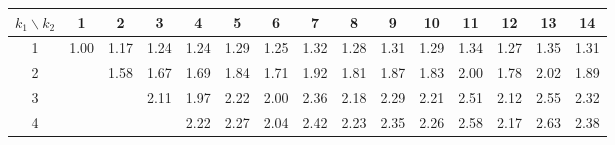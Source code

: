 \documentclass[a4paper, 11pt, ngerman]{article}
\theoremstyle{definition}
\theoremstyle{plain}
\theoremstyle{remark}
\begin{document}
\begin{figure}
    \vspace{0.2em}

    \begin{tabular}{c|cccccccccccccc}
        $k_1 \backslash k_2$ & 1                                & 2                                & 3                                & 4                                & 5                                & 6                                & 7                                & 8                                & 9                                & 10                               & 11                               & 12                               & 13                               & 14                               \\
        \hline
        1                    & \textcolor[HTML]{ 0020ff }{1.00} & \textcolor[HTML]{ 0c20f2 }{1.17} & \textcolor[HTML]{ 1120ed }{1.24} & \textcolor[HTML]{ 1220ec }{1.24} & \textcolor[HTML]{ 1520e9 }{1.29} & \textcolor[HTML]{ 1220ec }{1.25} & \textcolor[HTML]{ 1720e7 }{1.32} & \textcolor[HTML]{ 1520e9 }{1.28} & \textcolor[HTML]{ 1620e8 }{1.31} & \textcolor[HTML]{ 1520e9 }{1.29} & \textcolor[HTML]{ 1920e5 }{1.34} & \textcolor[HTML]{ 1420ea }{1.27} & \textcolor[HTML]{ 1a20e4 }{1.35} & \textcolor[HTML]{ 1720e7 }{1.31} \\
        2                    &                                  & \textcolor[HTML]{ 2b20d3 }{1.58} & \textcolor[HTML]{ 3220cc }{1.67} & \textcolor[HTML]{ 3320cb }{1.69} & \textcolor[HTML]{ 3e20c0 }{1.84} & \textcolor[HTML]{ 3520c9 }{1.71} & \textcolor[HTML]{ 4420ba }{1.92} & \textcolor[HTML]{ 3c20c2 }{1.81} & \textcolor[HTML]{ 4120bd }{1.87} & \textcolor[HTML]{ 3d20c1 }{1.83} & \textcolor[HTML]{ 4a20b4 }{2.00} & \textcolor[HTML]{ 3a20c4 }{1.78} & \textcolor[HTML]{ 4c20b2 }{2.02} & \textcolor[HTML]{ 4220bc }{1.89} \\
        3                    &                                  &                                  & \textcolor[HTML]{ 5220ac }{2.11} & \textcolor[HTML]{ 4820b6 }{1.97} & \textcolor[HTML]{ 5b20a3 }{2.22} & \textcolor[HTML]{ 4b20b3 }{2.00} & \textcolor[HTML]{ 652099 }{2.36} & \textcolor[HTML]{ 5820a6 }{2.18} & \textcolor[HTML]{ 60209e }{2.29} & \textcolor[HTML]{ 5a20a4 }{2.21} & \textcolor[HTML]{ 70208e }{2.51} & \textcolor[HTML]{ 5320ab }{2.12} & \textcolor[HTML]{ 73208b }{2.55} & \textcolor[HTML]{ 62209c }{2.32} \\
        4                    &                                  &                                  &                                  & \textcolor[HTML]{ 5a20a4 }{2.22} & \textcolor[HTML]{ 5e20a0 }{2.27} & \textcolor[HTML]{ 4d20b1 }{2.04} & \textcolor[HTML]{ 6a2094 }{2.42} & \textcolor[HTML]{ 5b20a3 }{2.23} & \textcolor[HTML]{ 64209a }{2.35} & \textcolor[HTML]{ 5d20a1 }{2.26} & \textcolor[HTML]{ 762088 }{2.58} & \textcolor[HTML]{ 5720a7 }{2.17} & \textcolor[HTML]{ 792085 }{2.63} & \textcolor[HTML]{ 672097 }{2.38} \\

\end{tabular}
\end{figure}
\end{document}
